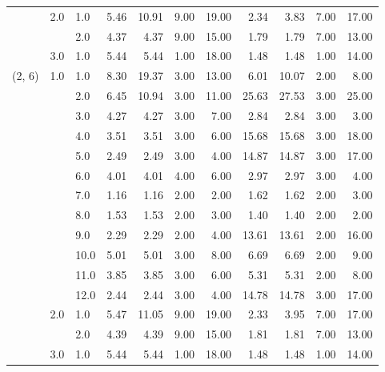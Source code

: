 \begin{tabular}{lllrrrrrrrr}
       & 2.0 & 1.0  &       5.46 &     10.91 &  9.00 &  19.00 &       2.34 &      3.83 & 7.00 &  17.00 \\
       &     & 2.0  &       4.37 &      4.37 &  9.00 &  15.00 &       1.79 &      1.79 & 7.00 &  13.00 \\
       & 3.0 & 1.0  &       5.44 &      5.44 &  1.00 &  18.00 &       1.48 &      1.48 & 1.00 &  14.00 \\
(2, 6) & 1.0 & 1.0  &       8.30 &     19.37 &  3.00 &  13.00 &       6.01 &     10.07 & 2.00 &   8.00 \\
       &     & 2.0  &       6.45 &     10.94 &  3.00 &  11.00 &      25.63 &     27.53 & 3.00 &  25.00 \\
       &     & 3.0  &       4.27 &      4.27 &  3.00 &   7.00 &       2.84 &      2.84 & 3.00 &   3.00 \\
       &     & 4.0  &       3.51 &      3.51 &  3.00 &   6.00 &      15.68 &     15.68 & 3.00 &  18.00 \\
       &     & 5.0  &       2.49 &      2.49 &  3.00 &   4.00 &      14.87 &     14.87 & 3.00 &  17.00 \\
       &     & 6.0  &       4.01 &      4.01 &  4.00 &   6.00 &       2.97 &      2.97 & 3.00 &   4.00 \\
       &     & 7.0  &       1.16 &      1.16 &  2.00 &   2.00 &       1.62 &      1.62 & 2.00 &   3.00 \\
       &     & 8.0  &       1.53 &      1.53 &  2.00 &   3.00 &       1.40 &      1.40 & 2.00 &   2.00 \\
       &     & 9.0  &       2.29 &      2.29 &  2.00 &   4.00 &      13.61 &     13.61 & 2.00 &  16.00 \\
       &     & 10.0 &       5.01 &      5.01 &  3.00 &   8.00 &       6.69 &      6.69 & 2.00 &   9.00 \\
       &     & 11.0 &       3.85 &      3.85 &  3.00 &   6.00 &       5.31 &      5.31 & 2.00 &   8.00 \\
       &     & 12.0 &       2.44 &      2.44 &  3.00 &   4.00 &      14.78 &     14.78 & 3.00 &  17.00 \\
       & 2.0 & 1.0  &       5.47 &     11.05 &  9.00 &  19.00 &       2.33 &      3.95 & 7.00 &  17.00 \\
       &     & 2.0  &       4.39 &      4.39 &  9.00 &  15.00 &       1.81 &      1.81 & 7.00 &  13.00 \\
       & 3.0 & 1.0  &       5.44 &      5.44 &  1.00 &  18.00 &       1.48 &      1.48 & 1.00 &  14.00 \\

\end{tabular}
